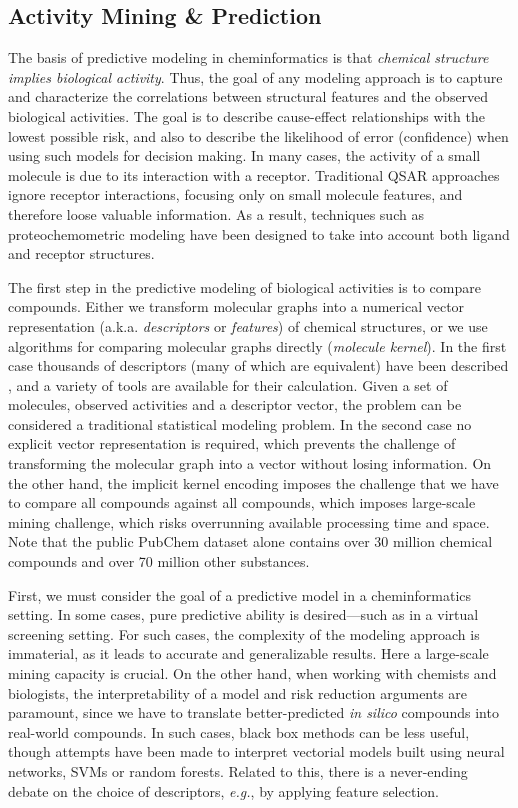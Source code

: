 \documentclass{sig-alternate}
\begin{document}
\subsection{Activity Mining \& Prediction}
\label{sec:activity-mining}


The basis of predictive modeling in cheminformatics is that
\emph{chemical structure implies biological activity}. Thus, the goal
of any modeling approach is to capture and characterize the
correlations between structural features and the observed biological
activities. The goal is to describe cause-effect relationships with
the lowest possible risk, and also to describe the likelihood of error
(confidence) when using such models for decision making. In many
cases, the activity of a small molecule is due to its interaction with
a receptor. Traditional QSAR approaches ignore receptor interactions,
focusing only on small molecule features, and therefore loose valuable
information. As a result, techniques such as proteochemometric
modeling have been designed to take into account both ligand and
receptor structures.

The first step in the predictive modeling of biological activities is
to compare compounds. Either we transform molecular graphs into a
numerical vector representation (a.k.a. \emph{descriptors} or
\emph{features}) of chemical structures, or we use algorithms for
comparing molecular graphs directly (\emph{molecule kernel}). In the
first case thousands of descriptors (many of which are equivalent)
have been described \cite{todeschini2000},
and a variety of tools are available for their calculation. Given a
set of molecules, observed activities and a descriptor vector, the
problem can be considered a traditional statistical modeling
problem. In the second case no explicit vector representation is
required, which prevents the challenge of transforming the molecular 
graph into a vector without losing information. On the other hand, the 
implicit kernel encoding imposes the challenge that we have to compare all compounds against
all compounds, which imposes large-scale mining challenge, which risks overrunning available
processing time and space. Note that the public PubChem dataset alone
contains over 30 million chemical compounds and over 70 million other
substances.

First, we must consider the goal of a predictive model in a
cheminformatics setting. In some cases, pure predictive ability is
desired---such as in a virtual screening setting. For such cases, the
complexity of the modeling approach is immaterial, as it leads to
accurate and generalizable results. Here a large-scale mining capacity
is crucial. On the other hand, when working with chemists and
biologists, the interpretability of a model and risk reduction
arguments are paramount, since we have to translate better-predicted
\emph{in silico} compounds into real-world compounds. In such cases,
black box methods can be less useful, though attempts have been made
to interpret vectorial models built using neural networks, SVMs or
random forests. Related to this, there is a never-ending debate on the
choice of descriptors, \emph{e.g.}, by applying feature selection.
\end{document}
